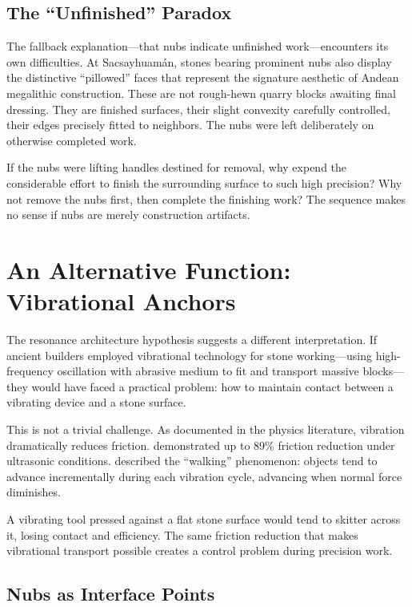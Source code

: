 \documentclass[11pt]{article}
\begin{document}
\subsection{The ``Unfinished'' Paradox}

The fallback explanation—that nubs indicate unfinished work—encounters its own difficulties. At Sacsayhuamán, stones bearing prominent nubs also display the distinctive ``pillowed'' faces that represent the signature aesthetic of Andean megalithic construction. These are not rough-hewn quarry blocks awaiting final dressing. They are finished surfaces, their slight convexity carefully controlled, their edges precisely fitted to neighbors. The nubs were left deliberately on otherwise completed work.

If the nubs were lifting handles destined for removal, why expend the considerable effort to finish the surrounding surface to such high precision? Why not remove the nubs first, then complete the finishing work? The sequence makes no sense if nubs are merely construction artifacts.

\section{An Alternative Function: Vibrational Anchors}

The resonance architecture hypothesis suggests a different interpretation. If ancient builders employed vibrational technology for stone working—using high-frequency oscillation with abrasive medium to fit and transport massive blocks—they would have faced a practical problem: how to maintain contact between a vibrating device and a stone surface.

This is not a trivial challenge. As documented in the physics literature, vibration dramatically reduces friction. \citet{Luo2024} demonstrated up to 89\% friction reduction under ultrasonic conditions. \citet{Popov2020} described the ``walking'' phenomenon: objects tend to advance incrementally during each vibration cycle, advancing when normal force diminishes.

A vibrating tool pressed against a flat stone surface would tend to skitter across it, losing contact and efficiency. The same friction reduction that makes vibrational transport possible creates a control problem during precision work.

\subsection{Nubs as Interface Points}
\end{document}
